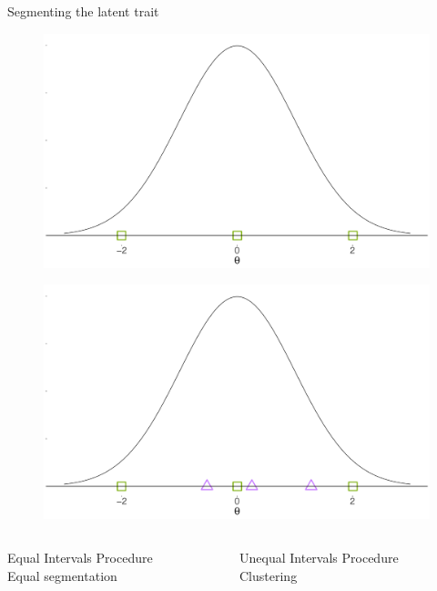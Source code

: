 \documentclass{beamer} %
\begin{document}
	
\begin{frame}{Segmenting the latent trait}
	\vspace*{-3mm}
	\begin{overprint}
		\begin{figure}
			\centering
			\includegraphics[width=.90\linewidth]{eip}
		\end{figure}
		\begin{figure}
			\centering
			\includegraphics[width=.90\linewidth]{latent}
		\end{figure}
	\end{overprint}

\begin{columns}[T]
	\begin{column}{.50\linewidth}
		\begin{center}
			\textcolor{eip}{Equal Intervals Procedure}\\
			\small Equal segmentation
		\end{center}
	\end{column}
	\begin{column}{.50\linewidth}
	\begin{center}
		\textcolor{uip}{Unequal Intervals Procedure}\\
		\small Clustering
	\end{center}
\end{column}
\end{columns}
	
\end{frame}
\end{document}
